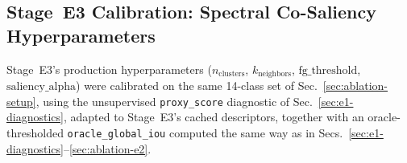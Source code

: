 %
%

\subsection{Stage~E3 Calibration: Spectral Co-Saliency Hyperparameters}
\label{sec:ablation-e3}

Stage~E3's production hyperparameters ($n_{\text{clusters}}$, $k_{\text{neighbors}}$,
$\text{fg\_threshold}$, $\text{saliency\_alpha}$) were calibrated on the same
14-class set of Sec.~\ref{sec:ablation-setup}, using the unsupervised
\texttt{proxy\_score} diagnostic of Sec.~\ref{sec:e1-diagnostics}, adapted to
Stage~E3's cached descriptors, together with an oracle-thresholded
\texttt{oracle\_global\_iou} computed the same way as in
Secs.~\ref{sec:e1-diagnostics}--\ref{sec:ablation-e2}.

